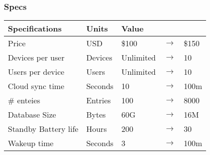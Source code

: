 \documentclass{beamer}
\begin{document}
\begin{frame}
  \frametitle{Specs}
  \begin{table}
    \centering
    \begin{tabular}{lllll}
      \hline
      Specifications                & Units   & \multicolumn{3}{l}{Value} \\
      \hline
      Price                & USD     & \$100     & $\rightarrow$ & \$150 \\
      Devices per user     & Devices & Unlimited & $\rightarrow$ & 10    \\
      Users per device     & Users   & Unlimited & $\rightarrow$ & 10    \\
      Cloud sync time      & Seconds & 10        & $\rightarrow$ & 100m  \\
      \# enteies           & Entries & 100       & $\rightarrow$ & 8000  \\
      Database Size        & Bytes   & 60G       & $\rightarrow$ & 16M   \\
      Standby Battery life & Hours   & 200       & $\rightarrow$ & 30    \\
      Wakeup time          & Seconds & 3         & $\rightarrow$ & 100m  \\
      \hline
    \end{tabular}
  \end{table}
\end{frame}
\end{document}
